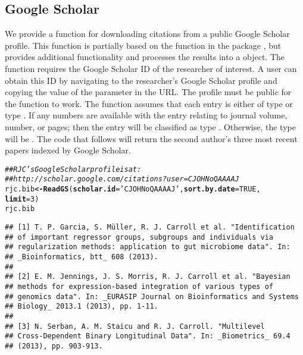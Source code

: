 \documentclass[article]{jss}\usepackage[]{graphicx}\usepackage[]{color}
\makeatletter
\newcommand{\hlnum}[1]{\textcolor[rgb]{0.125,0.125,1}{#1}}%
\newcommand{\hlstr}[1]{\textcolor[rgb]{0.125,0.125,1}{#1}}%
\newcommand{\hlcom}[1]{\textcolor[rgb]{1,0,0.753}{\textit{#1}}}%
\newcommand{\hlstd}[1]{\textcolor[rgb]{0.251,0.251,0.282}{#1}}%
\newcommand{\hlkwb}[1]{\textcolor[rgb]{0.439,0.251,1}{\textbf{#1}}}%
\newcommand{\hlkwc}[1]{\textcolor[rgb]{0.529,0,0.184}{\textbf{#1}}}%
\newcommand{\hlkwd}[1]{\textcolor[rgb]{0.251,0.251,0.282}{\textbf{#1}}}%
\newenvironment{kframe}{%
 \def\at@end@of@kframe{}%
 \ifinner\ifhmode%
  \def\at@end@of@kframe{\end{minipage}}%
  \begin{minipage}{\columnwidth}%
 \fi\fi%
 \def\FrameCommand##1{\hskip\@totalleftmargin \hskip-\fboxsep
 \colorbox{shadecolor}{##1}\hskip-\fboxsep
     \hskip-\linewidth \hskip-\@totalleftmargin \hskip\columnwidth}%
 \MakeFramed {\advance\hsize-\width
   \@totalleftmargin\z@ \linewidth\hsize
   \@setminipage}}%
 {\par\unskip\endMakeFramed%
 \at@end@of@kframe}
\newenvironment{knitrout}{}{} %
\makeatother
\begin{document}
\subsection{Google Scholar}
We provide a function for downloading citations from a public Google Scholar profile.  This function is partially based on the function  in the  package \citep{scholar}, but provides additional functionality and processes the results into a  object.  The function requires the Google Scholar ID of the researcher of interest.  A user can obtain this ID by navigating to the researcher's Google Scholar profile and copying the value of the  parameter in the URL.  The profile must be public for the function to work.  The function assumes that each entry is either of type  or type .  If any numbers are available with the entry relating to journal volume, number, or pages; then the entry will be classified as type .  Otherwise, the type will be .  The code that follows will return the second author's three most recent papers indexed by Google Scholar.
\begin{knitrout}
\color{fgcolor}\begin{kframe}
\begin{alltt}
\hlcom{## RJC's Google Scholar profile is at: }
\hlcom{## http://scholar.google.com/citations?user=CJOHNoQAAAAJ}
\hlstd{rjc.bib} \hlkwb{<-} \hlkwd{ReadGS}\hlstd{(}\hlkwc{scholar.id} \hlstd{=} \hlstr{'CJOHNoQAAAAJ'}\hlstd{,} \hlkwc{sort.by.date} \hlstd{=} \hlnum{TRUE}\hlstd{,}
                  \hlkwc{limit} \hlstd{=} \hlnum{3}\hlstd{)}
\hlstd{rjc.bib}
\end{alltt}
\begin{verbatim}
## [1] T. P. Garcia, S. Müller, R. J. Carroll et al. "Identification
## of important regressor groups, subgroups and individuals via
## regularization methods: application to gut microbiome data". In:
## _Bioinformatics, btt_ 608 (2013).
## 
## [2] E. M. Jennings, J. S. Morris, R. J. Carroll et al. "Bayesian
## methods for expression-based integration of various types of
## genomics data". In: _EURASIP Journal on Bioinformatics and Systems
## Biology_ 2013.1 (2013), pp. 1-11.
## 
## [3] N. Serban, A. M. Staicu and R. J. Carroll. "Multilevel
## Cross-Dependent Binary Longitudinal Data". In: _Biometrics_ 69.4
## (2013), pp. 903-913.
\end{verbatim}
\end{kframe}
\end{knitrout}
\end{document}
